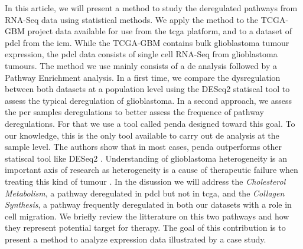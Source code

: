 In this article, we will present a method to study the deregulated pathways from RNA-Seq data using statistical methods.
We apply the method to the TCGA-GBM project data available for use from the \acrfull{tcga} platform, and to a dataset of \acrfull{pdcl} from the \acrfull{icm}.
While the TCGA-GBM contains bulk glioblastoma tumour expression, the \acrshort{pdcl} data consists of single cell RNA-Seq from glioblastoma tumours.
The method we use mainly consists of a \acrfull{de} analysis followed by a Pathway Enrichment analysis.
In a first time, we compare the dysregulation between both datasets at a population level using the DESeq2 statiscal tool to assess the typical deregulation of glioblastoma.
In a second approach, we assess the per samples deregulations to better assess the frequence of pathway deregulations. For that we use a tool called \acrfull{penda} designed toward this goal.
To our knowledge, this is the only tool available to carry out \acrlong{de} analysis at the sample level.
The authors show that in most cases, \acrshort{penda} outperforms other statiscal tool like DESeq2 \cite*{Richard2020}.
Understanding of glioblastoma heterogeneity is an important axis of research as heterogeneity is a cause of therapeutic failure when treating this kind of tumour \cite*{Neftel2019}.
In the disussion we will address the \textit{Cholesterol Metabolism}, a pathway deregulated in \acrshort{pdcl} but not in \acrshort{tcga}, and the \textit{Collagen Synthesis}, a pathway frequently deregulated in both our datasets with a role in cell migration.
We briefly review the litterature on this two pathways and how they represent potential target for therapy.
The goal of this contribution is to present a method to analyze expression data illustrated by a case study.